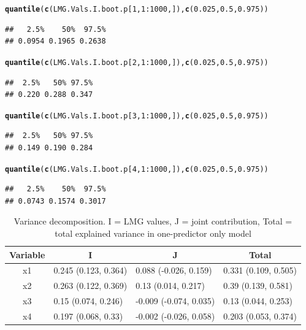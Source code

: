 \documentclass[11pt,a4paper,twoside]{book}\usepackage[]{graphicx}\usepackage[]{color}
\makeatletter
\newcommand{\hlnum}[1]{\textcolor[rgb]{0.686,0.059,0.569}{#1}}%
\newcommand{\hlopt}[1]{\textcolor[rgb]{0,0,0}{#1}}%
\newcommand{\hlstd}[1]{\textcolor[rgb]{0.345,0.345,0.345}{#1}}%
\newcommand{\hlkwd}[1]{\textcolor[rgb]{0.737,0.353,0.396}{\textbf{#1}}}%
\newenvironment{kframe}{%
 \def\at@end@of@kframe{}%
 \ifinner\ifhmode%
  \def\at@end@of@kframe{\end{minipage}}%
  \begin{minipage}{\columnwidth}%
 \fi\fi%
 \def\FrameCommand##1{\hskip\@totalleftmargin \hskip-\fboxsep
 \colorbox{shadecolor}{##1}\hskip-\fboxsep
     \hskip-\linewidth \hskip-\@totalleftmargin \hskip\columnwidth}%
 \MakeFramed {\advance\hsize-\width
   \@totalleftmargin\z@ \linewidth\hsize
   \@setminipage}}%
 {\par\unskip\endMakeFramed%
 \at@end@of@kframe}
\newenvironment{knitrout}{}{} %
\makeatother
\begin{document}
\begin{knitrout}
\begin{kframe}
\begin{alltt}
\hlkwd{quantile}\hlstd{(}\hlkwd{c}\hlstd{(LMG.Vals.I.boot.p[}\hlnum{1}\hlstd{,}\hlnum{1}\hlopt{:}\hlnum{1000}\hlstd{,]),} \hlkwd{c}\hlstd{(}\hlnum{0.025}\hlstd{,} \hlnum{0.5}\hlstd{,} \hlnum{0.975}\hlstd{))}
\end{alltt}
\begin{verbatim}
##   2.5%    50%  97.5% 
## 0.0954 0.1965 0.2638
\end{verbatim}
\begin{alltt}
\hlkwd{quantile}\hlstd{(}\hlkwd{c}\hlstd{(LMG.Vals.I.boot.p[}\hlnum{2}\hlstd{,}\hlnum{1}\hlopt{:}\hlnum{1000}\hlstd{,]),} \hlkwd{c}\hlstd{(}\hlnum{0.025}\hlstd{,} \hlnum{0.5}\hlstd{,} \hlnum{0.975}\hlstd{))}
\end{alltt}
\begin{verbatim}
##  2.5%   50% 97.5% 
## 0.220 0.288 0.347
\end{verbatim}
\begin{alltt}
\hlkwd{quantile}\hlstd{(}\hlkwd{c}\hlstd{(LMG.Vals.I.boot.p[}\hlnum{3}\hlstd{,}\hlnum{1}\hlopt{:}\hlnum{1000}\hlstd{,]),} \hlkwd{c}\hlstd{(}\hlnum{0.025}\hlstd{,} \hlnum{0.5}\hlstd{,} \hlnum{0.975}\hlstd{))}
\end{alltt}
\begin{verbatim}
##  2.5%   50% 97.5% 
## 0.149 0.190 0.284
\end{verbatim}
\begin{alltt}
\hlkwd{quantile}\hlstd{(}\hlkwd{c}\hlstd{(LMG.Vals.I.boot.p[}\hlnum{4}\hlstd{,}\hlnum{1}\hlopt{:}\hlnum{1000}\hlstd{,]),} \hlkwd{c}\hlstd{(}\hlnum{0.025}\hlstd{,} \hlnum{0.5}\hlstd{,} \hlnum{0.975}\hlstd{))}
\end{alltt}
\begin{verbatim}
##   2.5%    50%  97.5% 
## 0.0743 0.1574 0.3017
\end{verbatim}
\end{kframe}
\end{knitrout}



\begin{table}[h]
\centering
\begin{tabular}{clll}
  \hline
  \multicolumn{1}{c}{\textbf{Variable}} & \multicolumn{1}{c}{\textbf{I}} &\multicolumn{1}{c}{\textbf{J}} & \multicolumn{1}{c}{\textbf{Total}} \\
  \hline
x1 & 0.245 (0.123, 0.364)  & 0.088 (-0.026, 0.159)   & 0.331 (0.109, 0.505)  \\ 
x2 & 0.263 (0.122, 0.369)  & 0.13 (0.014, 0.217)   & 0.39 (0.139, 0.581)  \\ 
x3 & 0.15 (0.074, 0.246)  & -0.009 (-0.074, 0.035)   & 0.13 (0.044, 0.253)  \\ 
x4 & 0.197 (0.068, 0.33)  & -0.002 (-0.026, 0.058)   & 0.203 (0.053, 0.374)  \\ 

   \hline
\end{tabular}
\caption{Variance decomposition. I = LMG values, J = joint contribution, Total = total explained variance in one-predictor only model}
\label{tbl:fundus.to.SLO2}
\end{table}
\end{document}
